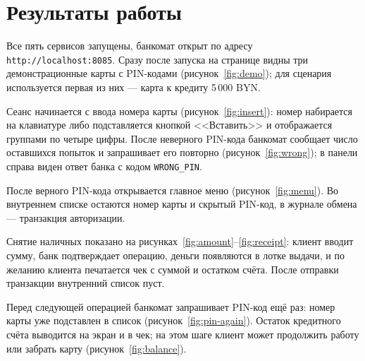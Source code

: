 \documentclass[14pt,a4paper]{extarticle}
\begin{document}
\section{Результаты работы}

Все пять сервисов запущены, банкомат открыт по адресу \texttt{http://localhost:8085}.
Сразу после запуска на странице видны три демонстрационные карты с PIN-кодами
(рисунок~\ref{fig:demo}); для сценария используется первая из них --- карта к кредиту
5\,000 BYN.


Сеанс начинается с ввода номера карты (рисунок~\ref{fig:insert}): номер набирается на
клавиатуре либо подставляется кнопкой <<Вставить>> и отображается группами по четыре цифры.
После неверного PIN-кода банкомат сообщает число оставшихся попыток и запрашивает его
повторно (рисунок~\ref{fig:wrong}); в панели справа виден ответ банка с кодом
\texttt{WRONG\_PIN}.



После верного PIN-кода открывается главное меню (рисунок~\ref{fig:menu}). Во внутреннем
списке остаются номер карты и скрытый PIN-код, в журнале обмена --- транзакция авторизации.


Снятие наличных показано на рисунках~\ref{fig:amount}--\ref{fig:receipt}: клиент вводит
сумму, банк подтверждает операцию, деньги появляются в лотке выдачи, и по желанию клиента
печатается чек с суммой и остатком счёта. После отправки транзакции внутренний список пуст.




Перед следующей операцией банкомат запрашивает PIN-код ещё раз: номер карты уже
подставлен в список (рисунок~\ref{fig:pin-again}). Остаток кредитного счёта выводится на
экран и в чек; на этом шаге клиент может продолжить работу или забрать карту
(рисунок~\ref{fig:balance}).

\end{document}
